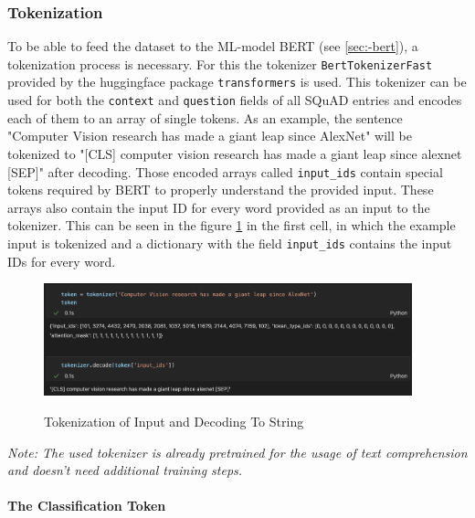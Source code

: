             \subsubsection{Tokenization}
            \label{par:-data-preprocessing-augmenting---tokenization}

                To be able to feed the dataset to the ML-model BERT (see \ref{sec:-bert}), a tokenization process is necessary.
                For this the tokenizer \texttt{BertTokenizerFast} provided by the huggingface package \texttt{transformers} is used.
                This tokenizer can be used for both the \texttt{context} and \texttt{question} fields of all SQuAD entries and encodes each of them to an array of single tokens. 
                As an example, the sentence "Computer Vision research has made a giant leap since AlexNet" will be tokenized to "[CLS] computer vision research has made a giant leap since alexnet [SEP]" after decoding.
                Those encoded arrays called \texttt{input\_ids} contain special tokens required by BERT to properly understand the provided input. These arrays also contain the input ID for every word provided as an input to the tokenizer.
                This can be seen in the figure \ref{fig:-tokenizer-output-decode} in the first cell, in which the example input is tokenized and a dictionary with the field \texttt{input\_ids} contains the input IDs for every word.
                \begin{figure}[h!]
                    \centering
                    \caption{Tokenization of Input and Decoding To String \cite[\texttt{bert\_training.ipynb}]{innerProject}}
                    \includegraphics[width=0.95\textwidth]{figures/tokenizer_output_decode.png}
                    \label{fig:-tokenizer-output-decode}
                \end{figure}
                \emph{Note: The used tokenizer is already pretrained for the usage of text comprehension and doesn't need additional training steps.}


                \paragraph{The Classification Token}
                \label{par:-the-classification-token}

